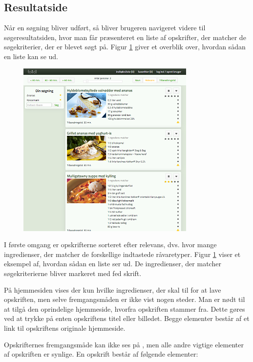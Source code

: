 \subsection{Resultatside}
\label{subsec:brug-resultat}

Når en søgning bliver udført, så bliver brugeren navigeret videre til søgeresultatsiden, hvor man får præsenteret en liste af opskrifter, der matcher de søgekriterier, der er blevet søgt på. Figur \ref{fig:overblik-resultat} giver et overblik over, hvordan sådan en liste kan se ud.

\begin{figure}[ht]
	\centering
	\includegraphics[scale=1]{billeder/foodl/thumbnails/soegeresultat.png}
	\label{fig:overblik-resultat}
\end{figure}

I første omgang er opskrifterne sorteret efter relevans, dvs. hvor mange ingredienser, der matcher de forskellige indtastede råvaretyper. Figur \ref{fig:overblik-resultat} viser et eksempel af, hvordan sådan en liste ser ud. De ingredienser, der matcher søgekriterierne bliver markeret med fed skrift. 

På hjemmesiden vises der kun hvilke ingredienser, der skal til for at lave opskriften, men selve fremgangsmåden er ikke vist nogen steder. Man er nødt til at tilgå den oprindelige hjemmeside, hvorfra opskriften stammer fra. Dette gøres ved at trykke på enten opskriftens titel eller billedet. Begge elementer består af et link til opskriftens originale hjemmeside. 

Opskrifternes fremgangsmåde kan ikke ses på \Foodl{}, men alle andre vigtige elementer af opskriften er synlige. En opskrift består af følgende elementer:

